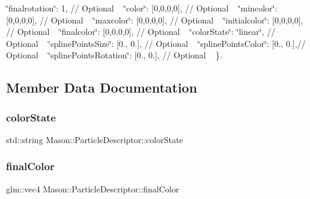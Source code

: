  \char`\"{}finalrotation\char`\"{}\+: 1, // Optional ~\newline
 \char`\"{}color\char`\"{}\+: \mbox{[}0,0,0,0\mbox{]}, // Optional ~\newline
 \char`\"{}mincolor\char`\"{}\+: \mbox{[}0,0,0,0\mbox{]}, // Optional ~\newline
 \char`\"{}maxcolor\char`\"{}\+: \mbox{[}0,0,0,0\mbox{]}, // Optional ~\newline
 \char`\"{}initialcolor\char`\"{}\+: \mbox{[}0,0,0,0\mbox{]}, // Optional ~\newline
 \char`\"{}finalcolor\char`\"{}\+: \mbox{[}0,0,0,0\mbox{]}, // Optional ~\newline
 \char`\"{}color\+State\char`\"{}\+: \char`\"{}linear\char`\"{}, // Optional ~\newline
 \char`\"{}spline\+Points\+Size\char`\"{}\+: \mbox{[}0., 0.\mbox{]}, // Optional ~\newline
 \char`\"{}spline\+Points\+Color\char`\"{}\+: \mbox{[}0., 0.\mbox{]},// Optional ~\newline
 \char`\"{}spline\+Points\+Rotation\char`\"{}\+: \mbox{[}0., 0.\mbox{]}, // Optional ~\newline
 \}. 

\subsection{Member Data Documentation}
\hypertarget{class_mason_1_1_particle_descriptor_aea9d3bf8cd0eaf89a9d34ca698062280}{}\label{class_mason_1_1_particle_descriptor_aea9d3bf8cd0eaf89a9d34ca698062280} 
\subsubsection{\texorpdfstring{color\+State}{colorState}}
{\footnotesize\ttfamily std\+::string Mason\+::\+Particle\+Descriptor\+::color\+State}

\hypertarget{class_mason_1_1_particle_descriptor_a2b01be3725b46d1f4ef7a6775347be66}{}\label{class_mason_1_1_particle_descriptor_a2b01be3725b46d1f4ef7a6775347be66} 
\subsubsection{\texorpdfstring{final\+Color}{finalColor}}
{\footnotesize\ttfamily glm\+::vec4 Mason\+::\+Particle\+Descriptor\+::final\+Color}


